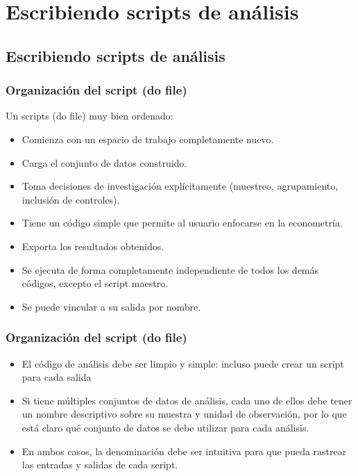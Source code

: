 \documentclass[10pt, aspectratio=169, compress]{beamer}
\begin{document}
\section{Escribiendo scripts de análisis}
\subsection{Escribiendo scripts de análisis}
\begin{frame}[t]
	\frametitle{Organización del script (do file)}
	Un scripts (do file) muy bien ordenado:
	\begin{itemize}[<+->]
		\item Comienza con un espacio de trabajo completamente nuevo.
		\item Carga el conjunto de datos construido.
		\item Toma decisiones de investigación explícitamente (muestreo, agrupamiento, inclusión de controles).
		\item Tiene un código simple que permite al usuario enfocarse en la econometría.
		\item Exporta los resultados obtenidos.
		\item Se ejecuta de forma completamente independiente de todos los demás códigos, excepto el script maestro.
		\item Se puede vincular a su salida por nombre.
	\end{itemize}
\end{frame}
\begin{frame}[t]
	\frametitle{Organización del script (do file)}
	\begin{itemize}[<+->]
		\item El código de análisis debe ser limpio y simple: incluso puede crear un script para cada salida
		\item Si tiene múltiples conjuntos de datos de análisis, cada uno de ellos debe tener un nombre descriptivo sobre su muestra y unidad de observación, por lo que está claro qué conjunto de datos se debe utilizar para cada análisis.
		\item En ambos casos, la denominación debe ser intuitiva para que pueda rastrear las entradas y salidas de cada script.
	\end{itemize}
\end{frame}
\end{document}
